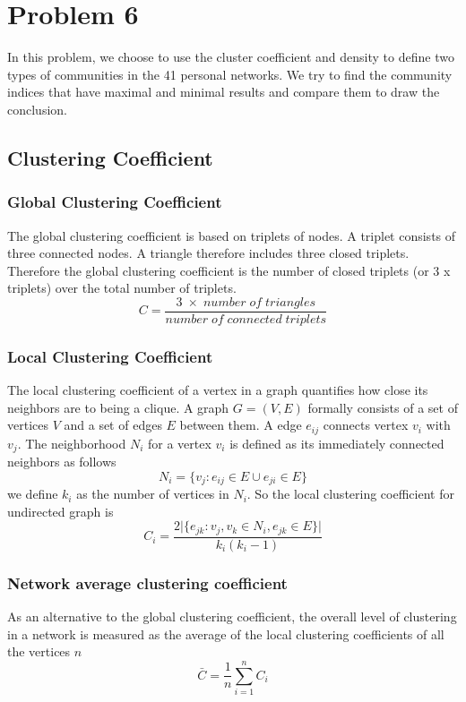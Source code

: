 \documentclass{article}
\begin{document}
\section{Problem 6}
In this problem, we choose to use the cluster coefficient and density to define two types of communities in the 41 personal networks. We try to find the community indices that have maximal and minimal results and compare them to draw the conclusion.
\subsection{Clustering Coefficient}
\subsubsection{Global Clustering Coefficient}
The global clustering coefficient is based on triplets of nodes. A triplet consists of three connected nodes. A triangle therefore includes three closed triplets. Therefore the global clustering coefficient is the number of closed triplets (or 3 x triplets) over the total number of triplets.
\begin{equation*}
C = \frac{3\;\times\;number\; of\; triangles}{number\; of\; connected\; triplets}
\end{equation*}
\subsubsection{Local Clustering Coefficient}
The local clustering coefficient of a vertex in a graph quantifies how close its neighbors are to being a clique. A graph $G=(V,E)$ formally consists of a set of vertices $V$ and a set of edges $E$ between them. A edge $e_{ij}$ connects vertex $v_i$ with $v_j$. The neighborhood $N_i$ for a vertex $v_i$ is defined as its immediately connected neighbors as follows
\begin{equation*}
N_i=\lbrace v_j:e_{ij}\in E \cup e_{ji} \in E \rbrace
\end{equation*} 
we define $k_i$ as the number of vertices in $N_i$. So the local clustering coefficient for undirected graph is
\begin{equation*}
C_i = \frac{2 \vert \lbrace e_{jk} : v_j, v_k \in N_i, e_{jk} \in E\rbrace\vert}{k_i(k_i-1)}
\end{equation*}
\subsubsection{Network average clustering coefficient}
As an alternative to the global clustering coefficient, the overall level of clustering in a network is measured as the average of the local clustering coefficients of all the vertices $n$
\begin{equation*}
\bar{C} = \frac{1}{n} \sum_{i=1}^nC_i
\end{equation*}
\end{document}
